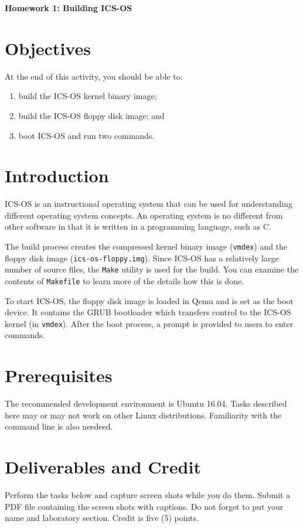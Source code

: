\documentclass[a4paper, 11pt,oneside]{article}
\begin{document}
\begin{center}
	{\LARGE \textbf{Homework 1: Building ICS-OS}}
\end{center}

\section*{Objectives}
   At the end of this activity, you should be able to:
   \begin{enumerate}[itemsep=0pt,parsep=0pt]
       \item build the ICS-OS kernel binary image;
       \item build the ICS-OS floppy disk image; and
       \item boot ICS-OS and run two commands.
   \end{enumerate}   

\section{Introduction}
ICS-OS is an instructional operating system that can be used for understanding different operating system concepts.  An operating system is no different from other software in that it is written in a programming language, such as C. 

The build process creates the compressed kernel binary image (\texttt{vmdex}) and the floppy disk image (\texttt{ics-os-floppy.img}). Since ICS-OS has a relatively large number of source files, 
the \texttt{Make} utility is used for the build. You can examine the contents of \texttt{Makefile} 
to learn more of the details how this is done.

To start ICS-OS, the floppy disk image is loaded in Qemu and is set as the boot device. It contains 
the GRUB bootloader which transfers control to the ICS-OS kernel (in \texttt{vmdex}). After the boot process, a prompt is provided to users to enter commands. 

\section{Prerequisites}
The recommended development environment is Ubuntu 16.04. Tasks described here may or may not 
work on other Linux distributions. Familiarity with the command line is also needeed.

\section{Deliverables and Credit}
Perform the tasks below and capture screen shots while you do them. Submit a PDF file 
containing the screen shots with captions. Do not forget to put your name and laboratory section.
Credit is five (5) points.
\end{document}
